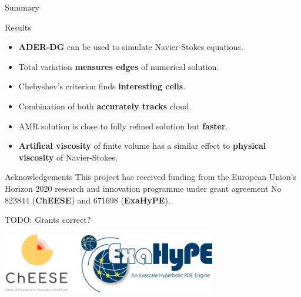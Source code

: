 \documentclass[aspectratio=169]{beamer}
\begin{document}
\begin{frame}{Summary}
  \begin{block}{Results}
    \begin{itemize}
    \item \textbf{ADER-DG} can be used to simulate Navier-Stokes equations.
    \item Total variation \textbf{measures edges} of numerical solution.
    \item Chebyshev's criterion finds \textbf{interesting cells}.
    \item Combination of both \textbf{accurately tracks} cloud.
    \item AMR solution is close to fully refined solution but \textbf{faster}.
    \item \textbf{Artifical viscosity} of finite volume has a similar effect to \textbf{physical viscosity} of Navier-Stokes.  
    \end{itemize}
  \end{block}
\end{frame}

\begin{frame}{Acknowledgements}
This project has received funding from the European Union's Horizon 2020 research and
innovation programme under grant agreement No 823844 (\textbf{ChEESE}) and 671698 (\textbf{ExaHyPE}).

TODO: Grants correct?

\begin{center}
\includegraphics[width=0.7\textwidth]{logos}
\end{center}
\end{frame}
\end{document}
